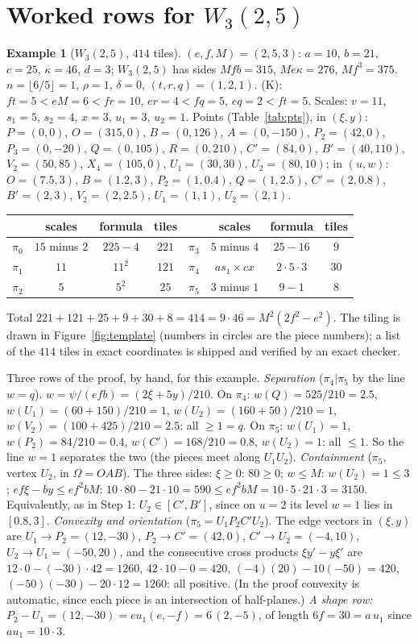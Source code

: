 \documentclass[11pt,reqno]{amsart}
\theoremstyle{plain}
\theoremstyle{definition}
\newtheorem{example}[theorem]{Example}
\begin{document}
\section{Worked rows for $W_3(2,5)$}\label{sec:worked}
\begin{example}[$W_3(2,5)$, $414$ tiles]\label{ex:414}
$(e,f,M)=(2,5,3)$: $a=10$, $b=21$, $c=25$, $\kappa=46$, $d=3$; $W_3(2,5)$ has sides $Mfb=315$, $Me\kappa=276$, $Mf^3=375$. $n=\lfloor6/5\rfloor=1$, $\rho=1$, $\delta=0$, $(t,r,q)=(1,2,1)$. (K): $ft=5<eM=6<fr=10$, $er=4<fq=5$, $eq=2<ft=5$. Scales: $v=11$, $s_1=5$, $s_2=4$, $x=3$, $u_1=3$, $u_2=1$.
Points (Table~\ref{tab:pts}), in $(\xi,y)$: $P=(0,0)$, $O=(315,0)$, $B=(0,126)$, $A=(0,-150)$, $P_2=(42,0)$, $P_3=(0,-20)$, $Q=(0,105)$, $R=(0,210)$, $C'=(84,0)$, $B'=(40,110)$, $V_2=(50,85)$, $X_4=(105,0)$, $U_1=(30,30)$, $U_2=(80,10)$; in $(u,w)$: $O=(7.5,3)$, $B=(1.2,3)$, $P_2=(1,0.4)$, $Q=(1,2.5)$, $C'=(2,0.8)$, $B'=(2,3)$, $V_2=(2,2.5)$, $U_1=(1,1)$, $U_2=(2,1)$.
\begin{center}\small
\begin{tabular}{@{}lccc@{\qquad}lccc@{}}
\toprule
 & scales & formula & tiles & & scales & formula & tiles\\
\midrule
$\pi_0$ & $15$ minus $2$ & $225-4$ & $221$ & $\pi_3$ & $5$ minus $4$ & $25-16$ & $9$\\
$\pi_1$ & $11$ & $11^2$ & $121$ & $\pi_4$ & $as_1\times cx$ & $2\cdot5\cdot3$ & $30$\\
$\pi_2$ & $5$ & $5^2$ & $25$ & $\pi_5$ & $3$ minus $1$ & $9-1$ & $8$\\
\bottomrule
\end{tabular}
\end{center}
Total $221+121+25+9+30+8=414=9\cdot46=M^2(2f^2-e^2)$. The tiling is drawn in Figure~\ref{fig:template} (numbers in circles are the piece numbers); a list of the $414$ tiles in exact coordinates is shipped and verified by an exact checker.
\end{example}
Three rows of the proof, by hand, for this example.
\emph{Separation} ($\pi_4|\pi_5$ by the line $w=q$). $w=\psi/(efb)=(2\xi+5y)/210$. On $\pi_4$: $w(Q)=525/210=2.5$, $w(U_1)=(60+150)/210=1$, $w(U_2)=(160+50)/210=1$, $w(V_2)=(100+425)/210=2.5$: all $\ge1=q$. On $\pi_5$: $w(U_1)=1$, $w(P_2)=84/210=0.4$, $w(C')=168/210=0.8$, $w(U_2)=1$: all $\le1$. So the line $w=1$ separates the two (the pieces meet along $U_1U_2$).
\emph{Containment} ($\pi_5$, vertex $U_2$, in $\Omega=OAB$). The three sides: $\xi\ge0$: $80\ge0$; $w\le M$: $w(U_2)=1\le3$; $ef\xi-by\le ef^2bM$: $10\cdot80-21\cdot10=590\le ef^2bM=10\cdot5\cdot21\cdot3=3150$. Equivalently, as in Step 1: $U_2\in[C',B']$, since on $u=2$ its level $w=1$ lies in $[0.8,3]$.
\emph{Convexity and orientation} ($\pi_5=U_1P_2C'U_2$). The edge vectors in $(\xi,y)$ are $U_1\!\to\!P_2=(12,-30)$, $P_2\!\to\!C'=(42,0)$, $C'\!\to\!U_2=(-4,10)$, $U_2\!\to\!U_1=(-50,20)$, and the consecutive cross products $\xi y'-y\xi'$ are $12\cdot0-(-30)\cdot42=1260$, $42\cdot10-0=420$, $(-4)(20)-10(-50)=420$, $(-50)(-30)-20\cdot12=1260$: all positive. (In the proof convexity is automatic, since each piece is an intersection of half-planes.) \emph{A shape row:} $P_2-U_1=(12,-30)=eu_1(e,-f)=6\,(2,-5)$, of length $6f=30=a\,u_1$ since $a u_1=10\cdot3$.
\end{document}

